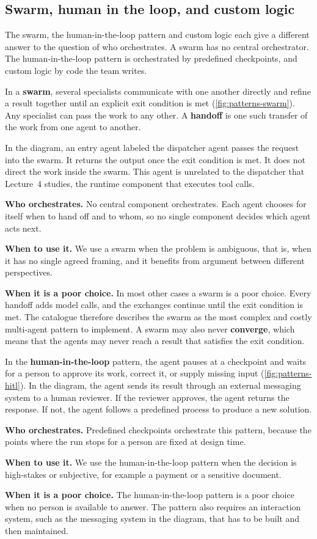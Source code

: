 \subsection{Swarm, human in the loop, and custom logic}
\label{sec:patterns-other}

The swarm, the human-in-the-loop pattern and custom logic each give a different answer to the
question of who orchestrates. A swarm has no central orchestrator. The human-in-the-loop pattern is
orchestrated by predefined checkpoints, and custom logic by code the team writes.

In a \textbf{swarm}, several specialists communicate with one another directly and refine a result
together until an explicit exit condition is met (\cref{fig:patterns-swarm}). Any specialist can
pass the work to any other. A \textbf{handoff} is one such transfer of the work from one agent to
another.

In the diagram, an entry agent labeled the dispatcher agent passes the request into the swarm. It
returns the output once the exit condition is met. It does not direct the work inside the swarm.
This agent is unrelated to the dispatcher that Lecture~4 studies, the runtime component that
executes tool calls.
\bi
\item \textbf{Who orchestrates.} No central component orchestrates. Each agent chooses for itself
when to hand off and to whom, so no single component decides which agent acts next.
\item \textbf{When to use it.} We use a swarm when the problem is ambiguous, that is, when it has no
single agreed framing, and it benefits from argument between different perspectives.
\item \textbf{When it is a poor choice.} In most other cases a swarm is a poor choice. Every handoff
adds model calls, and the exchanges continue until the exit condition is met. The catalogue
therefore describes the swarm as the most complex and costly multi-agent pattern to implement. A
swarm may also never \textbf{converge}, which
means that the agents may never reach a result that satisfies the exit condition.
\ei

In the \textbf{human-in-the-loop} pattern, the agent pauses at a checkpoint and waits for a person to
approve its work, correct it, or supply missing input (\cref{fig:patterns-hitl}). In the diagram,
the agent sends its result through an external messaging system to a human reviewer. If the
reviewer approves, the agent returns the response. If not, the agent follows a predefined process
to produce a new solution.
\bi
\item \textbf{Who orchestrates.} Predefined checkpoints orchestrate this pattern, because the points
where the run stops for a person are fixed at design time.
\item \textbf{When to use it.} We use the human-in-the-loop pattern when the decision is high-stakes
or subjective, for example a payment or a sensitive document.
\item \textbf{When it is a poor choice.} The human-in-the-loop pattern is a poor choice when no
person is available to answer. The pattern also requires an interaction system, such as the
messaging system in the diagram, that has to be built and then maintained.
\ei

